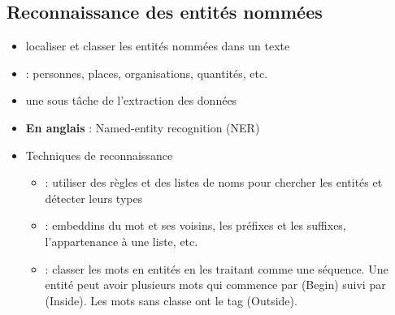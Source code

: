\documentclass{KodeBook}
\begin{document}
\subsection{Reconnaissance des entités nommées}

\begin{itemize}
	\item localiser et classer les entités nommées dans un texte
	\item {} : personnes, places, organisations, quantités, etc.
	\item une sous tâche de l'extraction des données
	\item \textbf{En anglais} : Named-entity recognition (NER)
	\item Techniques de reconnaissance 
	\begin{itemize}
		\item {} : utiliser des règles et des listes de noms pour chercher les entités et détecter leurs types
		\item {} : embeddins du mot et ses voisins, les préfixes et les suffixes, l'appartenance à une liste, etc.
		\item {} : classer les mots en entités en les traitant comme une séquence. Une entité peut avoir plusieurs mots qui commence par  (Begin) suivi par  (Inside). Les mots sans classe ont le tag  (Outside). 
		
	\end{itemize}
\end{itemize}



\begin{discussion}



\end{discussion}

\ifx\wholebook\relax\else
% 
% 
	
\end{document}
